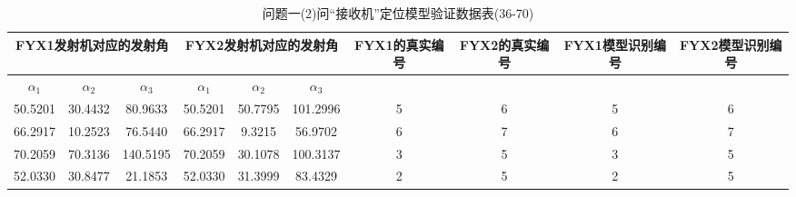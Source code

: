 \documentclass[withoutpreface,bwprint]{cumcmthesis} %
\begin{document}
\begin{appendices}
					
						\begin{table}[htbp!]
					\footnotesize
					\caption{问题一(2)问“接收机”定位模型验证数据表(36-70)}
					\centering
				\tabcolsep=0.1cm
				\begin{tabular}{@{}cccccccccc@{}}
					\toprule
					\multicolumn{3}{c}{\textbf{FYX1发射机对应的发射角}}                                                           & \multicolumn{3}{c}{\textbf{FYX2发射机对应的发射角}}                                                           & \textbf{FYX1的真实编号} & \textbf{FYX2的真实编号} & \textbf{FYX1模型识别编号} & \textbf{FYX2模型识别编号} \\ \midrule
					\multicolumn{1}{c|}{\textbf{$\alpha_{1}$}} & \multicolumn{1}{c|}{\textbf{$\alpha_{2}$}} & \multicolumn{1}{c|}{\textbf{$\alpha_{3}$}} & \multicolumn{1}{c|}{\textbf{$\alpha_{1}$}} & \multicolumn{1}{c|}{\textbf{$\alpha_{2}$}} & \multicolumn{1}{c|}{\textbf{$\alpha_{3}$}} & \multicolumn{4}{c}{\textbf{}}  
					\\ \midrule
							50.5201                          & 30.4432                          & 80.9633                          & 50.5201                          & 50.7795                          & 101.2996                         & 5                    & 6                    & 5                      & 6                      \\
							66.2917                          & 10.2523                          & 76.5440                          & 66.2917                          & 9.3215                           & 56.9702                          & 6                    & 7                    & 6                      & 7                      \\
							70.2059                          & 70.3136                          & 140.5195                         & 70.2059                          & 30.1078                          & 100.3137                         & 3                    & 5                    & 3                      & 5                      \\
							52.0330                          & 30.8477                          & 21.1853                          & 52.0330                          & 31.3999                          & 83.4329                          & 2                    & 5                    & 2                      & 5                      \\

\end{tabular}
\end{table}
\end{appendices}
\end{document}
